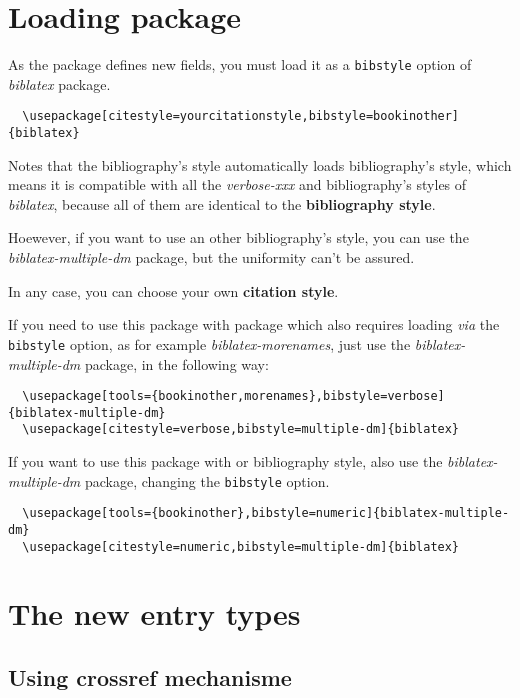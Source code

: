 \documentclass{ltxdockit}[2011/03/25]
\newcommand{\pkg}[1]{\emph{#1}}
\newcommand{\biblatex}{\emph{biblatex}\xspace}
\begin{document}
\section{Loading package}
As the package defines new fields, you must load it as a \verb+bibstyle+ option of \biblatex package.
 
\begin{verbatim}
  \usepackage[citestyle=yourcitationstyle,bibstyle=bookinother]{biblatex}
\end{verbatim}

Notes that the  bibliography's style automatically loads  bibliography's style, which means it is  compatible with all the \emph{verbose-xxx} and  bibliography's  styles of \biblatex, because all of them are identical to the  \textbf{bibliography style}.

Hoewever, if you want to use an other bibliography's style, you can use the \pkg{biblatex-multiple-dm} package, but the uniformity can't be assured.
 
In any case, you can choose your own \textbf{citation style}.
 
\label{morenames}If you need to use this package with package which also requires loading \emph{via} the \verb+bibstyle+ option, as for example \pkg{biblatex-morenames}, just use the \pkg{biblatex-multiple-dm} package, in the following way:

\begin{verbatim}
  \usepackage[tools={bookinother,morenames},bibstyle=verbose]{biblatex-multiple-dm}
  \usepackage[citestyle=verbose,bibstyle=multiple-dm]{biblatex}
\end{verbatim}

If you want to use this package with  or  bibliography style, also use the \pkg{biblatex-multiple-dm} package, changing the \verb+bibstyle+ option.

\begin{verbatim}
  \usepackage[tools={bookinother},bibstyle=numeric]{biblatex-multiple-dm}
  \usepackage[citestyle=numeric,bibstyle=multiple-dm]{biblatex}
\end{verbatim}

\section{The new entry types}

\subsection{Using crossref mechanisme}
\end{document}
